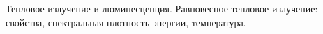\documentclass[__main__.tex]{subfiles}
\begin{document}
Тепловое излучение и люминесценция. Равновесное тепловое излучение: свойства, спектральная плотность энергии, температура.\\ 

\end{document}
